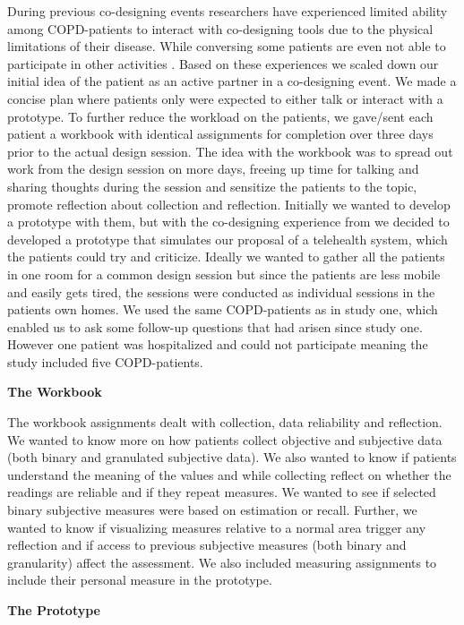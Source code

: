 During previous co-designing events researchers have  experienced limited ability among COPD-patients to interact with co-designing tools due to the physical limitations of their disease. While conversing some patients are even not able to participate in other activities \citep{genTech}. Based on these experiences we scaled down our initial idea of the patient as an active partner in a co-designing event. We made a concise plan where patients only were expected to either talk or interact with a prototype. To further reduce the workload on the patients, we gave/sent each patient a workbook with identical assignments for completion over three days prior to the actual design session. The idea with the workbook was to spread out work from the design session on more days, freeing up time for talking and sharing thoughts during the session and sensitize the patients to the topic, promote reflection about collection and reflection. Initially we wanted to develop a prototype with them, but with the co-designing experience from \citep{genTech} we decided to developed a prototype that simulates our proposal of a telehealth system, which the patients could try and criticize. Ideally we wanted to gather all the patients in one room for a common design session but since the patients are less mobile and easily gets tired, the sessions were conducted as individual sessions in the patients own homes. We used the same COPD-patients as in study one, which enabled us to ask some follow-up questions that had arisen since study one. However one patient was hospitalized and could not participate meaning the study included five COPD-patients.

\textbf{The Workbook}

The workbook assignments dealt with collection, data reliability and reflection. We wanted to know more on how patients collect objective and subjective data (both binary and granulated subjective data). We also wanted to know if patients understand the meaning of the values and while collecting reflect on whether the readings are reliable and if they repeat measures. We wanted to see if selected binary subjective measures were based on estimation or recall. Further, we wanted to know if visualizing measures relative to a normal area trigger any reflection and if access to previous subjective measures (both  binary and granularity) affect the assessment. We also included measuring assignments to include their personal measure in the prototype.


\textbf{The Prototype}

